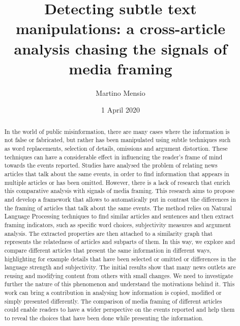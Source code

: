 \documentclass[12pt]{scrartcl}
\title{Detecting subtle text manipulations: a cross-article analysis chasing the signals of media framing}
\author{Martino Mensio}
\date{1 April 2020}
\begin{document}
\maketitle

\begin{abstract}
In the world of public misinformation, there are many cases where the information is not false or fabricated, but rather has been manipulated using subtle techniques such as word replacements, selection of details, omissions and argument distortion. These techniques can have a considerable effect in influencing the reader’s frame of mind towards the events reported.
Studies have analysed the problem of relating news articles that talk about the same events, in order to find information that appears in multiple articles or has been omitted. However, there is a lack of research that enrich this comparative analysis with signals of media framing.
This research aims to propose and develop a framework that allows to automatically put in contrast the differences in the framing of articles that talk about the same events.
The method relies on Natural Language Processing techniques to find similar articles and sentences and then extract framing indicators, such as specific word choices, subjectivity measures and argument analysis. The extracted properties are then attached to a similarity graph that represents the relatedness of articles and subparts of them. In this way, we explore and compare different articles that present the same information in different ways, highlighting for example details that have been selected or omitted or differences in the language strength and subjectivity.
The initial results show that many news outlets are reusing and modifying content from others with small changes. We need to investigate further the nature of this phenomenon and understand the motivations behind it.
This work can bring a contribution in analysing how information is copied, modified or simply presented differently. The comparison of media framing of different articles could enable readers to have a wider perspective on the events reported and help them to reveal the choices that have been done while presenting the information.
\end{abstract}
\end{document}
